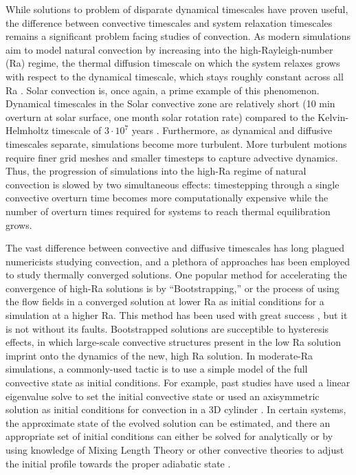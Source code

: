 \documentclass[aps, pre, onecolumn, nofootinbib, notitlepage, groupedaddress, amsfonts, amssymb, amsmath, longbibliography]{revtex4-1}
\begin{document}
While solutions to problem of disparate dynamical timescales have proven useful,
the difference between convective timescales and system relaxation timescales remains
a significant problem facing studies of convection. 
As modern simulations aim to model natural convection
by increasing into the high-Rayleigh-number (Ra) regime,
the thermal diffusion timescale on which the system relaxes grows with respect
to the dynamical timescale, which stays roughly constant across all Ra
\cite{anders&brown2017}.
Solar convection is, once again, a prime example of this phenomenon.
Dynamical timescales in the Solar convective zone are relatively short 
(10 min overturn at solar surface, one month solar
rotation rate) compared to the Kelvin-Helmholtz timescale of
$3 \cdot 10^7$ years \cite{stix2003}.  
Furthermore, as dynamical and diffusive timescales separate, 
simulations become more turbulent. More turbulent motions 
require finer grid meshes and smaller timesteps
to capture advective dynamics. Thus, the progression of simulations into the high-Ra
regime of natural convection is slowed by two simultaneous effects: timestepping
through a single convective overturn time becomes more computationally expensive
while the number of overturn times required for systems to reach thermal equilibration
grows.

The vast difference between convective and diffusive timescales has long plagued
numericists studying convection, and a plethora of approaches has been employed to
study thermally converged solutions. One popular method for accelerating the convergence
of high-Ra solutions is by ``Bootstrapping,'' or the process of using the flow
fields in a converged solution at lower Ra as initial conditions for a simulation at a higher
Ra.  This method has been used with great success \cite{johnston&doering2009, verzicco&camussi1997},
but it is not without its faults.  Bootstrapped solutions are succeptible to hysteresis
effects, in which large-scale convective structures present in the
low Ra solution imprint onto the dynamics of the new, high Ra solution. 
In moderate-Ra simulations, a commonly-used tactic is to use 
a simple model of the full convective state as initial conditions.  
For example, past studies have used a linear eigenvalue solve to set the initial
convective state \cite{hurlburt&all1984} or used an axisymmetric solution 
as initial conditions for convection in a 3D cylinder \cite{verzicco&camussi1997}. 
In certain systems, 
the approximate state of the evolved solution can be estimated, and there an
appropriate set of initial conditions can either be solved for analytically
\cite{couston&all2017} or by using knowledge of Mixing Length Theory or other convective
theories to adjust the initial profile towards the proper adiabatic state \cite{brandenburg&all2005}.
\end{document}
